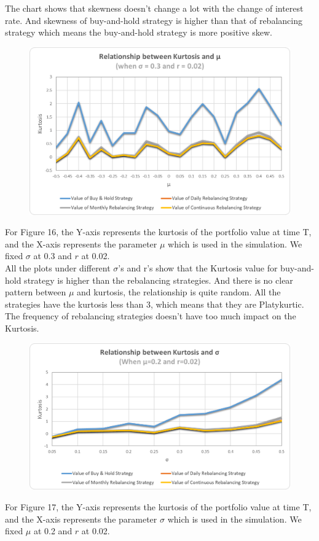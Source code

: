 \documentclass[
10pt, %
a4paper, %
oneside, %
headinclude,footinclude, %
BCOR5mm, %
]{scrartcl}
\begin{document}
The chart shows that skewness doesn’t change a lot with the change of interest rate. And skewness of buy-and-hold strategy is higher than that of rebalancing strategy which means the buy-and-hold strategy is more positive skew. \\

\begin{figure}[H]
	\centering
	\includegraphics[width=0.7\linewidth]{Kurto_mu_030_002}
	\caption{}
	\label{fig:kurtomu030002}
\end{figure}
For Figure 16, the Y-axis represents the kurtosis of the portfolio value at time T, and the X-axis represents the parameter $\mu$ which is used in the simulation. We fixed $\sigma$ at 0.3 and $r$ at 0.02.\\

All the plots under different $\sigma$’s and r’s show that the Kurtosis value for buy-and-hold strategy is higher than the rebalancing strategies. And there is no clear pattern between $\mu$ and kurtosis, the relationship is quite random. All the strategies have the kurtosis less than 3, which means that they are Platykurtic. The frequency of rebalancing strategies doesn’t have too much impact on the Kurtosis. \\



\begin{figure}[H]
	\centering
	\includegraphics[width=0.7\linewidth]{Kurto_sigma_020_002}
	\caption{}
	\label{fig:kurtosigma020002}
\end{figure}
For Figure 17, the Y-axis represents the kurtosis of the portfolio value at time T, and the X-axis represents the parameter $\sigma$ which is used in the simulation. We fixed $\mu$ at 0.2 and $r$ at 0.02.\\
\end{document}
